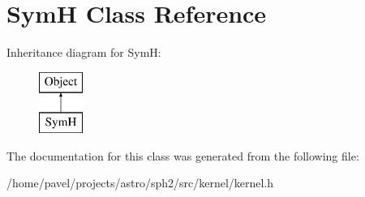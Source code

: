 \hypertarget{classSymH}{}\section{SymH Class Reference}
\label{classSymH}
Inheritance diagram for SymH\+:\begin{figure}[H]
\begin{center}
\leavevmode
\includegraphics[height=2.000000cm]{classSymH}
\end{center}
\end{figure}


The documentation for this class was generated from the following file\+:\begin{DoxyCompactItemize}
\item 
/home/pavel/projects/astro/sph2/src/kernel/kernel.\+h\end{DoxyCompactItemize}
